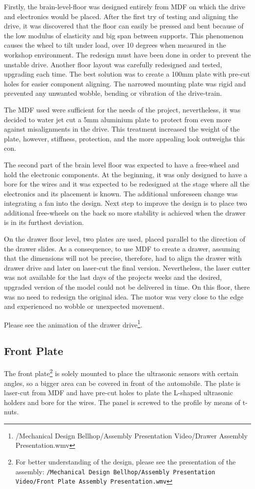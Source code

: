 \documentclass[11pt]{article}
\begin{document}
Firstly, the brain-level-floor was designed entirely from MDF on which the drive and electronics would be placed. After the first try of testing and aligning the drive, it was discovered that the floor can easily be pressed and bent because of the low modulus of elasticity and big span between supports. This phenomenon causes the wheel to tilt under load, over 10 degrees when measured in the workshop environment. The redesign must have been done in order to prevent the unstable drive. Another floor layout was carefully redesigned and tested, upgrading each time. The best solution was to create a 100mm plate with pre-cut holes for easier component aligning. The narrowed mounting plate was rigid and prevented any unwanted wobble, bending or vibration of the drive-train.


The MDF used were sufficient for the needs of the project, nevertheless, it was decided to water jet cut a 5mm aluminium plate to protect from even more against misalignments in the drive. This treatment increased the weight of the plate, however, stiffness, protection, and the more appealing look outweighs this con.


The second part of the brain level floor was expected to have a free-wheel and hold the electronic components. At the beginning, it was only designed to have a bore for the wires and it was expected to be redesigned at the stage where all the electronics and its placement is known. The additional unforeseen change was integrating a fan into the design. Next step to improve the design is to place two additional free-wheels on the back so more stability is achieved when the drawer is in its furthest deviation.


On the drawer floor level, two plates are used, placed parallel to the direction of the drawer slides. As a consequence, to use MDF to create a drawer, assuming that the dimensions will not be precise, therefore,  had to align the drawer with drawer drive and later on laser-cut the final version. Nevertheless, the laser cutter was not available for the last days of the projects weeks and the desired, upgraded version of the model could not be delivered in time. On this floor, there was no need to redesign the original idea. The motor was very close to the edge and experienced no wobble or unexpected movement.


Please see the animation of the drawer drive\footnote{/Mechanical Design Bellhop/Assembly Presentation Video/Drawer Assembly Presentation.wmv}.

\subsection*{Front Plate}
The front plate\footnote{For better understanding of the design, please see the presentation of the assembly: \texttt{/Mechanical Design Bellhop/Assembly Presentation Video/Front Plate Assembly Presentation.wmv}} is solely mounted to place the ultrasonic sensors with certain angles, so a bigger area can be covered in front of the automobile. The plate is laser-cut from MDF and have pre-cut holes to plate the L-shaped ultrasonic holders and bore for the wires. The panel is screwed to the profile by means of t-nuts. 
\end{document}
